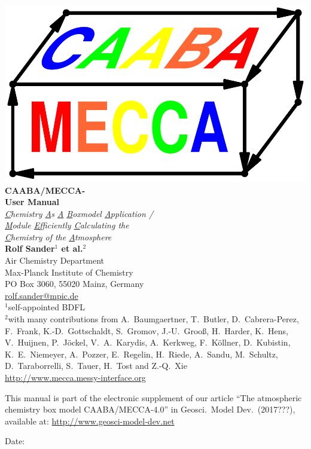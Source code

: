 \documentclass[a4paper,twoside]{article}
\begin{document}
\thispagestyle{empty}
\begin{center}
  \vspace*{-15mm}
  \includegraphics[height=0.3\textheight]{caaba_mecca_logo_print}\\[10mm]
  {\Huge\bf CAABA/MECCA-{\meccaversion}}\\[5mm]
  {\Huge\bf User Manual}\\[10mm]
  {\huge\em \underline{C}hemistry \underline{A}s \underline{A}
    \underline{B}oxmodel \underline{A}pplication /}\\[3mm]
  {\huge\em \underline{M}odule \underline{E}fficiently
    \underline{C}alculating the\\[5mm]
    \underline{C}hemistry of the
    \underline{A}tmosphere}\\[5mm]
  {\huge\bf Rolf Sander$^1$ et al.$^2$}\\[5mm]
  \Large
  Air Chemistry Department\\
  Max-Planck Institute of Chemistry\\
  PO Box 3060, 55020 Mainz, Germany\\
  \url{rolf.sander@mpic.de}\\[5mm]
  $^1$self-appointed BDFL\\ 
  $^2$with many contributions from
  A.~Baumgaertner,
  T.~Butler,
  D.~Cabrera-Perez,
  F.~Frank,
  K.-D.~Gottschaldt,
  S.~Gromov,
  J.-U.~Groo\ss,
  H.~Harder,
  K.~Hens,
  V.~Huijnen,
  P.~J\"ockel,
  V.~A.~Karydis,
  A.~Kerkweg,
  F.~K\"ollner,
  D.~Kubistin,
  K.~E.~Niemeyer,
  A.~Pozzer,
  E.~Regelin,
  H.~Riede,
  A.~Sandu,
  M.~Schultz,
  D.~Taraborrelli,
  S.~Tauer,
  H.~Tost and
  Z.-Q.~Xie\\[5mm]

  {\huge\url{http://www.mecca.messy-interface.org}}

  \vfill

  {{\large This manual is part of the electronic supplement of our
      article ``The atmospheric chemistry box model CAABA/MECCA-4.0'' in
      Geosci.\ Model Dev.\ (2017???), available at:
      \url{http://www.geosci-model-dev.net}}} %
  {} %

  Date: \myfiledate

\end{center}
\end{document}
